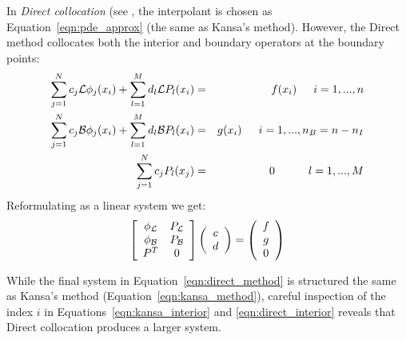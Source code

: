 \documentclass[11pt]{report}
\begin{document}
{In \emph{Direct collocation} (see \cite{Larsson2003, Fedoseyev2002}, the interpolant is chosen as Equation~\ref{eqn:pde_approx} (the same as Kansa's method). However, the Direct method collocates both the interior and boundary operators at the boundary points:
\begin{eqnarray}
\sum_{j=1}^{N}c_j\mathcal{L}\phi_j(x_i) + \sum_{l=1}^{M}d_l \mathcal{L}P_l(x_i) &=&f(x_i)  \hskip1.5em i = 1,...,n  \label{eqn:direct_interior} \\ 
\sum_{j=1}^{N}c_j\mathcal{B}\phi_j(x_i) + \sum_{l=1}^{M}d_l \mathcal{B}P_l(x_i) &=& g(x_i)  \hskip1.5em i = 1,..., n_B=n-n_I \label{eqn:direct_boundary} \nonumber \\
 \sum_{j=1}^{N} c_j P_l(x_j) &=& 0 \hskip3.0em l=1,...,M \label{eqn:direct_constraints} \nonumber 
\end{eqnarray}
Reformulating as a linear system we get: 
\begin{eqnarray}
\left[ \begin{array}{c c} 
	\phi_{\mathcal{L}} & P_{\mathcal{L}} \\
	\phi_{\mathcal{B}} & P_{\mathcal{B}} \\
	P^T  & 0 \\
	\end{array} \right] \left( \begin{array}{c}
							{c} \\
							{d}
							 \end{array}
						 \right) = \left( \begin{array}{c}
							{f} \\
							{g} \\
							0
							 \end{array}
						 \right) 
	\label{eqn:direct_method}
\end{eqnarray}

While the final system in Equation~\ref{eqn:direct_method} is structured the same as Kansa's method (Equation~\ref{eqn:kansa_method}), %
careful inspection of the index $i$ in Equations~\ref{eqn:kansa_interior} and \ref{eqn:direct_interior} reveals that Direct collocation produces a larger system. %


}
\end{document}
